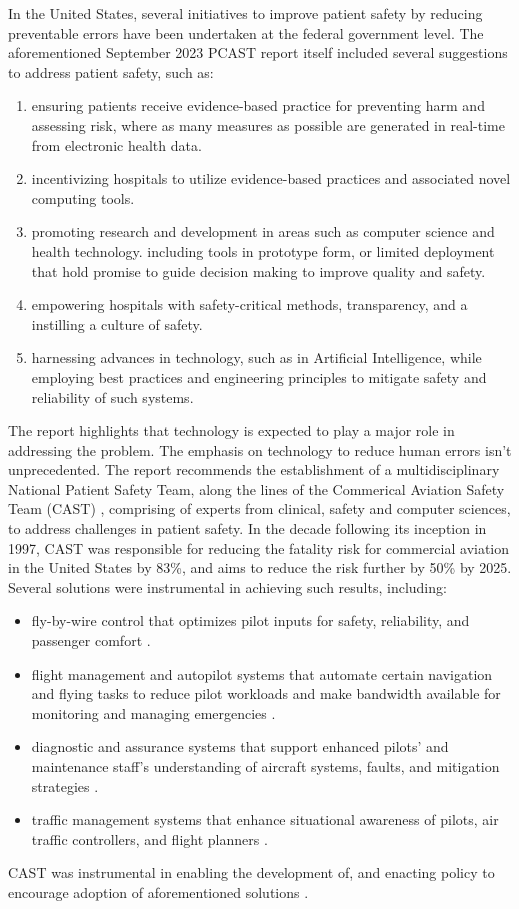 In the United States, several initiatives to improve patient safety by
reducing preventable errors have been undertaken at the federal government
level. The aforementioned September 2023 PCAST report itself included several suggestions to
address patient safety, such as:
\begin{enumerate}[label=(\roman*)]
  \item ensuring patients receive evidence-based practice for preventing
    harm and assessing risk, where as many measures as possible are
    generated in real-time from electronic health data.
  \item incentivizing hospitals to utilize evidence-based practices
    and associated novel computing tools.
  \item promoting research and development in areas such as
    computer science and health technology.
    including tools in prototype form, or limited deployment that
    hold promise to guide decision making to improve quality and safety.
  \item empowering hospitals with safety-critical methods, transparency,
    and a instilling a culture of safety.
  \item harnessing advances in technology, such as in Artificial Intelligence,
    while employing best practices and engineering principles to mitigate safety
    and reliability of such systems.
\end{enumerate}
The report highlights that technology is expected to play a major role in
addressing the problem. The emphasis on technology to reduce human errors
isn't unprecedented. The report recommends the establishment of a
multidisciplinary National Patient Safety Team, along the lines of
the Commerical Aviation Safety Team (CAST) \cite{CASTUrl}, comprising of
experts from clinical, safety and computer sciences, to address challenges
in patient safety. In the decade following its inception in 1997,
CAST was responsible for reducing the fatality risk for commercial aviation
in the United States by 83\%, and aims to reduce the risk further by 50\% by
2025. Several solutions were instrumental in achieving such results, including:
\begin{itemize}
  \item fly-by-wire control that optimizes pilot inputs for safety, reliability,
    and passenger comfort \cite{FBWSkybraryUrl}.
  \item flight management and autopilot systems that automate certain navigation
    and flying tasks to reduce pilot workloads and make bandwidth available for monitoring and
    managing emergencies \cite{CockpitAutomationSkybraryURL}.
  \item diagnostic and assurance systems that support enhanced pilots' and
    maintenance staff's understanding of aircraft systems, faults, and
    mitigation strategies \cite{CockpitAutomationSkybraryURL}.
  \item traffic management systems that enhance situational awareness of
    pilots, air traffic controllers, and flight planners \cite{ATMSkybraryUrl,TCASUrl}.
\end{itemize}
CAST was instrumental in enabling the development of, and enacting policy to
encourage adoption of aforementioned solutions \cite{CASTSafetySkybrary}.
